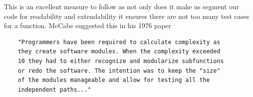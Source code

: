 This is an excellent measure to follow as not only does it make us segment our code for readability and extendability it ensures there are not too many test cases for a function.
\newline
McCabe suggested this in his 1976 paper \cite{cycloMaticComplexity}
\begin{verbatim}
    "Programmers have been required to calculate complexity as 
    they create software modules. When the complexity exceeded 
    10 they had to either recognize and modularize subfunctions 
    or redo the software. The intention was to keep the "size" 
    of the modules manageable and allow for testing all the 
    independent paths..."
\end{verbatim}
    